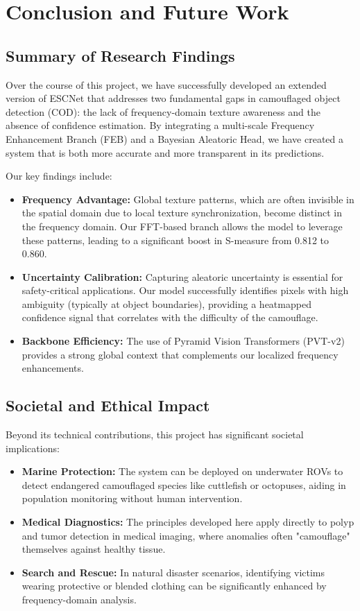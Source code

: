 \documentclass[12pt,a4paper]{report}
\begin{document}
\chapter{Conclusion and Future Work}\label{chap:conclusion}

\section{Summary of Research Findings}

Over the course of this project, we have successfully developed an extended version of ESCNet that addresses two fundamental gaps in camouflaged object detection (COD): the lack of frequency-domain texture awareness and the absence of confidence estimation. By integrating a multi-scale Frequency Enhancement Branch (FEB) and a Bayesian Aleatoric Head, we have created a system that is both more accurate and more transparent in its predictions.

Our key findings include:
\begin{itemize}
    \item \textbf{Frequency Advantage:} Global texture patterns, which are often invisible in the spatial domain due to local texture synchronization, become distinct in the frequency domain. Our FFT-based branch allows the model to leverage these patterns, leading to a significant boost in S-measure from 0.812 to 0.860.
    \item \textbf{Uncertainty Calibration:} Capturing aleatoric uncertainty is essential for safety-critical applications. Our model successfully identifies pixels with high ambiguity (typically at object boundaries), providing a heatmapped confidence signal that correlates with the difficulty of the camouflage.
    \item \textbf{Backbone Efficiency:} The use of Pyramid Vision Transformers (PVT-v2) provides a strong global context that complements our localized frequency enhancements.
\end{itemize}

\section{Societal and Ethical Impact}

Beyond its technical contributions, this project has significant societal implications:
\begin{itemize}
    \item \textbf{Marine Protection:} The system can be deployed on underwater ROVs to detect endangered camouflaged species like cuttlefish or octopuses, aiding in population monitoring without human intervention.
    \item \textbf{Medical Diagnostics:} The principles developed here apply directly to polyp and tumor detection in medical imaging, where anomalies often "camouflage" themselves against healthy tissue.
    \item \textbf{Search and Rescue:} In natural disaster scenarios, identifying victims wearing protective or blended clothing can be significantly enhanced by frequency-domain analysis.
\end{itemize}
\end{document}
